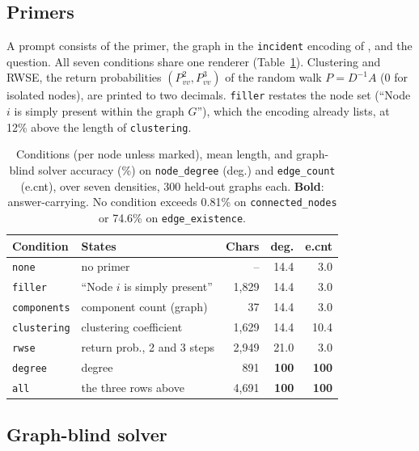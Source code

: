 \documentclass[11pt]{article}
\newcommand{\task}[1]{\texttt{#1}}
\newcommand{\cond}[1]{\texttt{#1}}
\begin{document}
\subsection{Primers}

A prompt consists of the primer, the graph in the \texttt{incident} encoding
of \citet{fatemi2023talklikeagraph}, and the question. All seven conditions
share one renderer (Table~\ref{tab:conditions}). Clustering and RWSE, the
return probabilities $(P^2_{vv},P^3_{vv})$ of the random walk $P{=}D^{-1}A$
(0 for isolated nodes), are printed to two decimals.
\cond{filler} restates the node set (``Node $i$ is simply present within the
graph $G$''), which the encoding already lists, at 12\% above the length of
\cond{clustering}.

\begin{table}[t]
\centering
\small
\setlength{\tabcolsep}{2.4pt}
\begin{tabular}{@{}llrrr@{}}
\toprule
Condition & States & Chars & deg. & e.cnt \\
\midrule
\cond{none}       & no primer                   & --    & 14.4 & 3.0 \\
\cond{filler}     & ``Node $i$ is simply present'' & 1,829 & 14.4 & 3.0 \\
\cond{components} & component count (graph)     & 37    & 14.4 & 3.0 \\
\cond{clustering} & clustering coefficient      & 1,629 & 14.4 & 10.4 \\
\cond{rwse}       & return prob., 2 and 3 steps & 2,949 & 21.0 & 3.0 \\
\cond{degree}     & degree                      & 891   & \textbf{100} & \textbf{100} \\
\cond{all}        & the three rows above        & 4,691 & \textbf{100} & \textbf{100} \\
\bottomrule
\end{tabular}
\caption{Conditions (per node unless marked), mean length, and graph-blind
solver accuracy (\%) on \task{node\_degree} (deg.) and \task{edge\_count} (e.cnt),
over seven densities, 300 held-out graphs each. \textbf{Bold}:
answer-carrying. No condition exceeds 0.81\% on \task{connected\_nodes} or
74.6\% on \task{edge\_existence}.}
\label{tab:conditions}
\end{table}

\subsection{Graph-blind solver}
\label{sec:solver}
\end{document}
